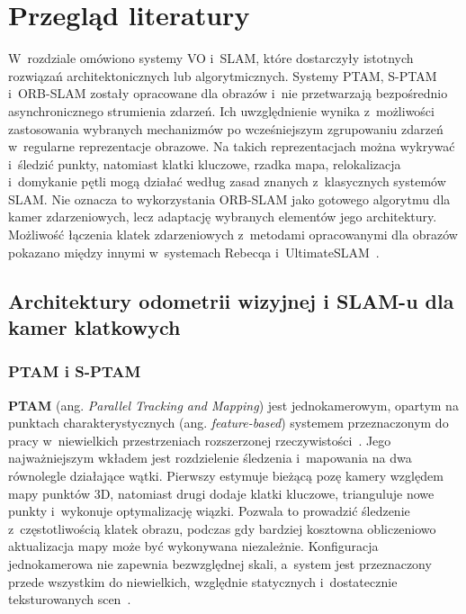 \chapter{Przegląd literatury}
\label{cha:przeglad_literatury}

W~rozdziale omówiono systemy VO i~SLAM, które dostarczyły istotnych rozwiązań architektonicznych lub algorytmicznych. Systemy PTAM, S-PTAM i~ORB-SLAM zostały opracowane dla obrazów i~nie przetwarzają bezpośrednio asynchronicznego strumienia zdarzeń. Ich uwzględnienie wynika z~możliwości zastosowania wybranych mechanizmów po wcześniejszym zgrupowaniu zdarzeń w~regularne reprezentacje obrazowe. Na takich reprezentacjach można wykrywać i~śledzić punkty, natomiast klatki kluczowe, rzadka mapa, relokalizacja i~domykanie pętli mogą działać według zasad znanych z~klasycznych systemów SLAM. Nie oznacza to wykorzystania ORB-SLAM jako gotowego algorytmu dla kamer zdarzeniowych, lecz adaptację wybranych elementów jego architektury. Możliwość łączenia klatek zdarzeniowych z~metodami opracowanymi dla obrazów pokazano między innymi w~systemach Rebecqa i~UltimateSLAM~\cite{rebecq2017eventvio,vidal2018ultimate}.

\section{Architektury odometrii wizyjnej i SLAM-u dla kamer klatkowych}
\label{sec:literatura_klasyczny_slam}


\subsection{PTAM i S-PTAM}
\label{subsec:literatura_ptam_sptam}

\textbf{PTAM} (ang. \textit{Parallel Tracking and Mapping}) jest jednokamerowym, opartym na punktach charakterystycznych (ang. \textit{feature-based}) systemem przeznaczonym do pracy w~niewielkich przestrzeniach rozszerzonej rzeczywistości~\cite{klein2007ptam}. Jego najważniejszym wkładem jest rozdzielenie śledzenia i~mapowania na dwa równolegle działające wątki. Pierwszy estymuje bieżącą pozę kamery względem mapy punktów 3D, natomiast drugi dodaje klatki kluczowe, trianguluje nowe punkty i~wykonuje optymalizację wiązki. Pozwala to prowadzić śledzenie z~częstotliwością klatek obrazu, podczas gdy bardziej kosztowna obliczeniowo aktualizacja mapy może być wykonywana niezależnie. Konfiguracja jednokamerowa nie zapewnia bezwzględnej skali, a~system jest przeznaczony przede wszystkim do niewielkich, względnie statycznych i~dostatecznie teksturowanych scen~\cite{klein2007ptam}.

